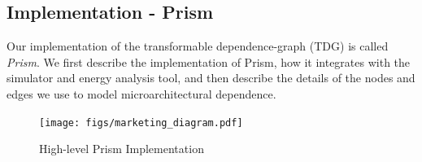 %

% 


\subsection{Implementation - Prism}
Our implementation of the transformable dependence-graph (TDG) is 
called \emph{Prism}.  We first describe the implementation
of Prism, how it integrates with the simulator and energy analysis
tool, and then describe the details of the nodes and 
edges we use to model microarchitectural dependence. %

\begin{figure}
  \begin{center}
    \texttt{[image: figs/marketing\_diagram.pdf]}
  \end{center}
  \caption{High-level Prism Implementation}
  \label{fig:prism}
\end{figure}
\fi

